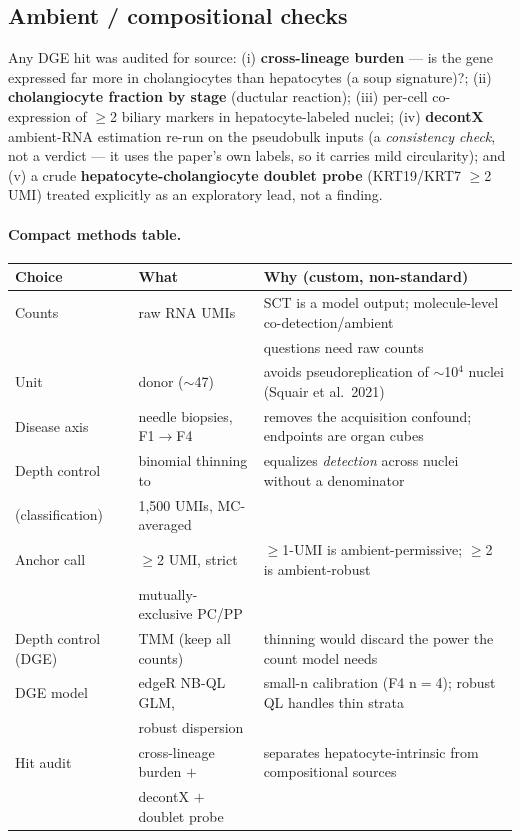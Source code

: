 \documentclass[11pt,a4paper]{article}
\begin{document}
\subsection{Ambient / compositional checks}

Any DGE hit was audited for source: (i) \textbf{cross-lineage burden} --- is the gene expressed far more in cholangiocytes than hepatocytes (a soup signature)?; (ii) \textbf{cholangiocyte fraction by stage} (ductular reaction); (iii) per-cell co-expression of $\ge$2 biliary markers in hepatocyte-labeled nuclei; (iv) \textbf{decontX} ambient-RNA estimation re-run on the pseudobulk inputs (a \emph{consistency check}, not a verdict --- it uses the paper's own labels, so it carries mild circularity); and (v) a crude \textbf{hepatocyte-cholangiocyte doublet probe} (KRT19/KRT7 $\ge$2 UMI) treated explicitly as an exploratory lead, not a finding.

\paragraph{Compact methods table.}
\begin{table}[h]
\centering\small
\begin{tabular}{lll}
\toprule
Choice & What & Why (custom, non-standard) \\
\midrule
Counts & raw RNA UMIs & SCT is a model output; molecule-level co-detection/ambient \\
 & & questions need raw counts \\
Unit & donor ($\sim$47) & avoids pseudoreplication of $\sim$10$^4$ nuclei (Squair et al.\ 2021) \\
Disease axis & needle biopsies, F1$\to$F4 & removes the acquisition confound; endpoints are organ cubes \\
Depth control & binomial thinning to & equalizes \emph{detection} across nuclei without a denominator \\
(classification) & 1{,}500 UMIs, MC-averaged & \\
Anchor call & $\ge$2 UMI, strict & $\ge$1-UMI is ambient-permissive; $\ge$2 is ambient-robust \\
 & mutually-exclusive PC/PP & \\
Depth control (DGE) & TMM (keep all counts) & thinning would discard the power the count model needs \\
DGE model & edgeR NB-QL GLM, & small-n calibration (F4 n$=$4); robust QL handles thin strata \\
 & robust dispersion & \\
Hit audit & cross-lineage burden $+$ & separates hepatocyte-intrinsic from compositional sources \\
 & decontX $+$ doublet probe & \\
\bottomrule
\end{tabular}
\end{table}
\end{document}
